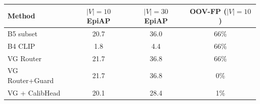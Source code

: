 \begin{tabular}{lccc}
\toprule
Method & $|V|{=}10$ EpiAP & $|V|{=}30$ EpiAP & OOV-FP ($|V|{=}10$) \\
\midrule
B5 subset & 20.7 & 36.0 & 66\% \\
B4 CLIP & 1.8 & 4.4 & 66\% \\
VG Router & 21.7 & 36.8 & 66\% \\
VG Router+Guard & 21.7 & 36.8 & 0\% \\
VG + CalibHead & 20.1 & 28.4 & 1\% \\
\bottomrule
\end{tabular}
